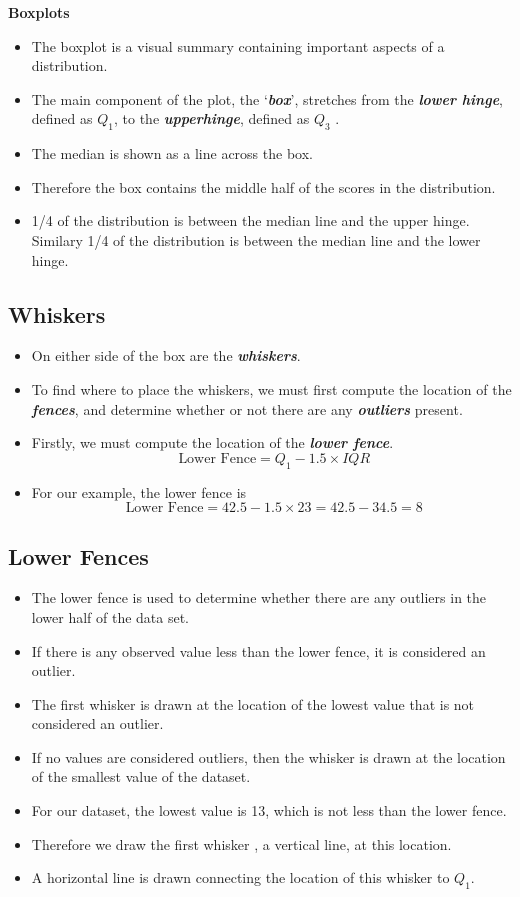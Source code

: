 \documentclass[a4paper,12pt]{article}
\begin{document}
{\textbf{Boxplots}
\begin{itemize}
\item The boxplot is a visual summary containing important aspects of a distribution. \item The main component of the plot, the `\textbf{\emph{box}}', stretches from the \textbf{\emph{lower hinge}}, defined as $Q_1$, to the \textbf{\emph{upperhinge}}, defined as $Q_3$ .
\item The median is shown as a line across the box.
\item Therefore the box contains the middle half of the scores in the distribution.
\item  1/4 of the distribution is between the median line and the upper hinge. Similary 1/4 of the distribution is between the median line and the lower hinge.
\end{itemize}

\subsection*{Whiskers}
\begin{itemize}
\item On either side of the box are the \textbf{\emph{whiskers}}.
\item To find where to place the whiskers, we must first compute the location of the \textbf{\emph{fences}}, and determine whether or not there are any \textbf{\emph{outliers}} present.
\item Firstly, we must compute the location of the \textbf{\emph{lower fence}}.
\[ \mbox{ Lower Fence}  = Q_1 - 1.5 \times IQR \]
\item For our example, the lower fence is
\[ \mbox{ Lower Fence}  = 42.5 - 1.5 \times 23  = 42.5 - 34.5 = 8 \]

\end{itemize}

\subsection*{Lower Fences}
\begin{itemize}
\item The lower fence is used to determine whether there are any outliers in the lower half of the data set.
\item If there is any observed value less than the lower fence, it is considered an outlier.
\item The first whisker is drawn at the location of the lowest value that is not considered an outlier.
\item If no values are considered outliers, then the whisker is drawn at the location of the smallest value of the dataset.
\item For our dataset, the lowest value is 13, which is not less than the lower fence.
\item Therefore we draw the first whisker , a vertical line, at this location.
\item A horizontal line is drawn connecting the location of this whisker to $Q_1$.


\end{itemize}}
\end{document}
